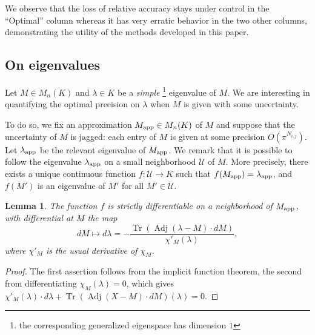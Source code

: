 \documentclass[sigconf]{acmart}
\DeclareMathOperator{\tr}{Tr}
\DeclareMathOperator{\adj}{Adj}
\newcommand{\calU}{\mathcal{U}}
\newcommand{\app}{\text{\rm app}}
\newtheorem{lem}[theo]{Lemma}
\theoremstyle{definition}
\begin{document}
We observe that the loss of relative accuracy stays under control in the 
``Optimal'' column whereas it has very erratic behavior in the two other columns,
demonstrating the utility of the methods developed in this paper.

\subsection{On eigenvalues}
\label{ssec:eigenvalues}

Let $M \in M_n(K)$ and $\lambda \in K$ be a \emph{simple}
\footnote{the corresponding generalized eigenspace has dimension $1$} eigenvalue 
of $M$. We are interesting in quantifying the optimal precision on 
$\lambda$ when $M$ is given with some uncertainty.

To do so, we fix an approximation $M_\app \in M_n(K)$ of $M$ and 
suppose that the uncertainty of $M$ is jagged:
each entry of $M$ is given at some precision $O(\pi^{N_{i,j}})$.
Let $\lambda_\app$ be the relevant eigenvalue of $M_\app$. We remark 
that it is possible to follow the eigenvalue $\lambda_\app$ on a small 
neighborhood $\calU$ of $M$. More precisely, there exists a unique continuous 
function $f : \calU \to K$ such that
$f(M_\app) = \lambda_\app$, and
$f(M')$ is an eigenvalue of $M'$ for all $M' \in \calU$.

\begin{lem}
The function $f$ is strictly differentiable on a neighborhood of 
$M_\app$, with differential at $M$ the map
\[
dM \mapsto d \lambda = - \frac{\tr(\adj(\lambda-M) \cdot dM)}
{\chi'_M(\lambda)},
\]
where $\chi'_M$ is the usual derivative of $\chi_M$.
\end{lem}

\begin{proof}
The first assertion follows from the implicit function theorem,
the second from differentiating $\chi_M(\lambda) = 0$, which gives
$\chi'_M(\lambda) \cdot d \lambda + \tr(\adj(X-M) \cdot dM)(\lambda) = 0$.
\end{proof}
\end{document}

